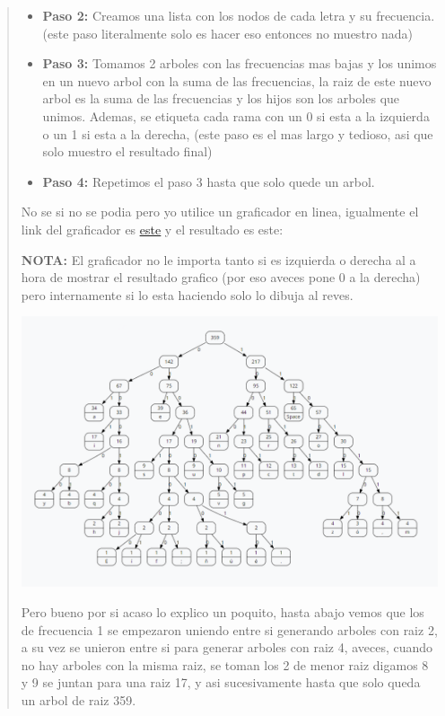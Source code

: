 \begin{quote}
\begin{itemize}
        \item \textbf{Paso 2:} Creamos una lista con los nodos de cada letra y su frecuencia. (este paso literalmente solo es hacer eso entonces no muestro nada)
        \item \textbf{Paso 3:} Tomamos 2 arboles con las frecuencias mas bajas y los unimos en un nuevo arbol con la suma de las frecuencias, la raiz de este nuevo arbol es la suma de las frecuencias y los hijos son los arboles que unimos. Ademas, se etiqueta cada rama con un 0 si esta a la izquierda o un 1 si esta a la derecha, (este paso es el mas largo y tedioso, asi que solo muestro el resultado final)
        \item \textbf{Paso 4:} Repetimos el paso 3 hasta que solo quede un arbol. \vspace{.2cm}
    \end{itemize}

    No se si no se podia pero yo utilice un graficador en linea, igualmente el link del graficador es \href{https://www.csfieldguide.org.nz/en/interactives/huffman-tree/}{\underline{este}} y el resultado es este: \vspace{.2cm}

    \textbf{NOTA:} El graficador no le importa tanto si es izquierda o derecha al a hora de mostrar el resultado grafico (por eso aveces pone 0 a la derecha) pero internamente si lo esta haciendo solo lo dibuja al reves. \vspace{.2cm}
    \begin{center}
        \includegraphics[width=14.9cm]{src/Img/ArbolHuffman.png}
    \end{center}

    Pero bueno por si acaso lo explico un poquito, hasta abajo vemos que los de frecuencia 1 se empezaron uniendo entre si generando arboles con raiz 2, a su vez se unieron entre si para generar arboles con raiz 4, aveces, cuando no hay arboles con la misma raiz, se toman los 2 de menor raiz digamos 8 y 9 se juntan para una raiz 17, y asi sucesivamente hasta que solo queda un arbol de raiz 359. \vspace{.2cm}


\end{quote}
